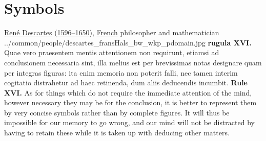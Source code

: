 \chapter*{Symbols}%
\qboxnpqt
  {
    \href{http://en.wikipedia.org/wiki/Descartes}{Ren\'e Descartes} 
    \href{http://www-history.mcs.st-andrews.ac.uk/Timelines/TimelineC.html}{(1596--1650)}, 
    \href{http://www-history.mcs.st-andrews.ac.uk/BirthplaceMaps/Places/France.html}{French} philosopher and mathematician
    \footnotemark
  }
  {../common/people/descartes_fransHals_bw_wkp_pdomain.jpg}
  {{\bf rugula XVI.}
      Quae vero praesentem mentis attentionem non requirunt,
      etiamsi ad conclusionem necessaria sint,
      illa melius est per brevissimas notas designare quam per integras figuras:
      ita enim memoria non poterit falli, nec tamen interim cogitatio distrahetur
      ad haec retinenda, dum aliis deducendis incumbit.}
  {{\bf Rule XVI.}
      As for things which do not require the immediate attention of the mind,
      however necessary they may be for the conclusion,
      it is better to represent them by very concise symbols rather than by
      complete figures.
      It will thus be impossible for our memory to go wrong,
      and our mind will not be distracted by having to retain these
      while it is taken up with deducing other matters.}



